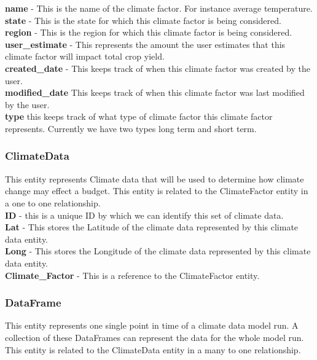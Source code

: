\documentclass[onecolumn, draftclsnofoot,10pt, compsoc]{article}
\begin{document}
					\textbf{name} - This is the name of the climate factor. For instance average temperature.\\
					
					\textbf{state} - This is the state for which this climate factor is being considered.\\
					
					\textbf{region} - This is the region for which this climate factor is being considered.\\
					
					\textbf{user\_estimate} - This represents the amount the user estimates that this climate factor will impact total crop yield.\\
					
					\textbf{created\_date} - This keeps track of when this climate factor was created by the user.\\
					
					\textbf{modified\_date} \- This keeps track of when this climate factor was last modified by the user.\\
					
					\textbf{type} \- this keeps track of what type of climate factor this climate factor represents. Currently we have two types long term and short term.\\
				
				\subsubsection{ClimateData}
					This entity represents Climate data that will be used to determine how climate change may effect a budget. This entity is related to the ClimateFactor entity in a one to one relationship.\\
				
					\textbf{ID} - this is a unique ID by which we can identify this set of climate data.\\
					
					\textbf{Lat} - This stores the Latitude of the climate data represented by this climate data entity.\\
					
					\textbf{Long} - This stores the Longitude of the climate data represented by this climate data entity.\\
					
					\textbf{Climate\_Factor} - This is a reference to the ClimateFactor entity.\\
				
				\subsubsection{DataFrame}
					This entity represents one single point in time of a climate data model run. A collection of these DataFrames can represent the data for the whole model run. This entity is related to the ClimateData entity in a many to one relationship.\\
					
\end{document}
